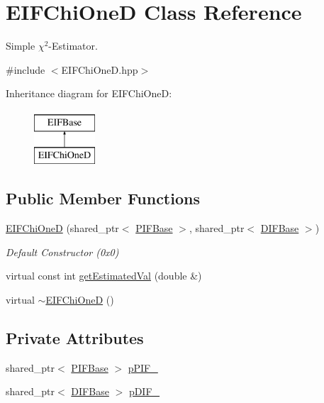 \hypertarget{classEIFChiOneD}{
\section{EIFChiOneD Class Reference}
\label{db/d1d/classEIFChiOneD}
}


Simple $\chi^{2}$-\/Estimator.  




{\ttfamily \#include $<$EIFChiOneD.hpp$>$}

Inheritance diagram for EIFChiOneD:\begin{figure}[H]
\begin{center}
\leavevmode
\includegraphics[height=2.000000cm]{db/d1d/classEIFChiOneD}
\end{center}
\end{figure}
\subsection*{Public Member Functions}
\begin{DoxyCompactItemize}
\item 
\hyperlink{classEIFChiOneD_a8f214fcc0497cd86c8bc0ee36d415b8a}{EIFChiOneD} (shared\_\-ptr$<$ \hyperlink{classPIFBase}{PIFBase} $>$, shared\_\-ptr$<$ \hyperlink{classDIFBase}{DIFBase} $>$)
\begin{DoxyCompactList}\small\item\em Default Constructor (0x0) \end{DoxyCompactList}\item 
virtual const int \hyperlink{classEIFChiOneD_a8a428668c99022b2b9bdae756fe792ca}{getEstimatedVal} (double \&)
\item 
virtual \hyperlink{classEIFChiOneD_ac826a3c3af84dd72fd96e32d597dd560}{$\sim$EIFChiOneD} ()
\end{DoxyCompactItemize}
\subsection*{Private Attributes}
\begin{DoxyCompactItemize}
\item 
shared\_\-ptr$<$ \hyperlink{classPIFBase}{PIFBase} $>$ \hyperlink{classEIFChiOneD_a615022d2c2b0b7bad99d4942b22f1be0}{pPIF\_\-}
\item 
shared\_\-ptr$<$ \hyperlink{classDIFBase}{DIFBase} $>$ \hyperlink{classEIFChiOneD_a8f16868a00dcf27d29ef837c73d24848}{pDIF\_\-}
\end{DoxyCompactItemize}


